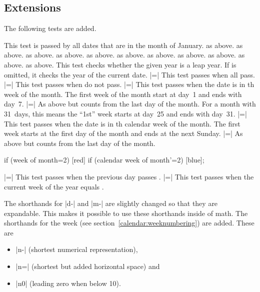 \begin{multicols}{2}

\subsection{Extensions}

The following tests are added.
\begin{itemize}
 This test is passed by all dates that are in the month of January.
 as above.
 as above.
 as above.
 as above.
 as above.
 as above.
 as above.
 as above.
 as above.
 as above.
 as above.
    This test checks whether the given year is a leap year. If
     is omitted, it checks the year of the current date.
|=|
    This test passes when all  pass.
|=|
    This test passes when  do not pass.
|=|
    This test passes when the date is in th week of the month.
    The first week of the month start at day~1 and ends with day~7.
|=|
    As above but counts from the last day of the month.
    For a month with 31~days, this means the ``1st'' week starts at day~25 and ends with day~31.
|=|
    This test passes when the date is in th calendar week of the month.
    The first week starts at the first day of the month and ends at the next Sunday.
|=|
    As above but counts from the last day of the month.
\begin{codeexample}[width=5cm,preamble=\usetikzlibrary{ext.calendar-plus}]
\tikz
  \calendar[
    dates=2022-10-01 to 2022-10-31,
    week list]
    if (week of month=2) [red]
    if (calendar week of month'=2) [blue];
\end{codeexample}
|=|
    This test passes when the previous day passes .
|=|
    This test passes when the current week of the year equals .
\end{itemize}
The shorthands for |d-| and |m-| are slightly changed so that they are
expandable. This makes it possible to use these shorthands inside of \pgfname math.
The shorthands for the week (see section~\ref{calendar:weeknumbering})
are added. These are
\begin{itemize}
\item |n-| (shortest numerical representation),
\item |n=| (shortest but added horizontal space) and
\item |n0| (leading zero when below 10).
\end{itemize}


\end{multicols}
